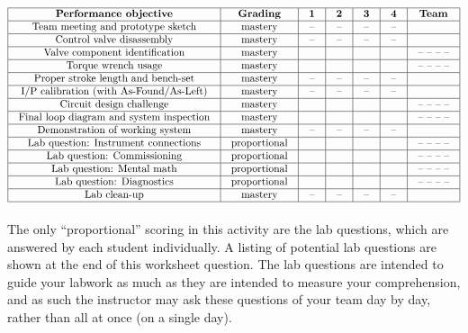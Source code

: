 \documentclass[12pt,a4paper]{article}
\begin{document}
\begin{itemize}


$$\vbox{\offinterlineskip
\halign{\strut
\vrule \quad\hfil # \ \hfil & 
\vrule \quad\hfil # \ \hfil & 
\vrule \quad\hfil # \ \hfil & 
\vrule \quad\hfil # \ \hfil & 
\vrule \quad\hfil # \ \hfil & 
\vrule \quad\hfil # \ \hfil & 
\vrule \quad\hfil # \ \hfil \vrule \cr
\noalign{\hrule}
%
{\bf Performance objective} & {\bf Grading} & {\bf 1} & {\bf 2} & {\bf 3} & {\bf 4} & {\bf Team} \cr
%
\noalign{\hrule}
%
Team meeting and prototype sketch & mastery & -- & -- & -- & -- & \cr
%
\noalign{\hrule}
%
Control valve disassembly & mastery & -- & -- & -- & -- & \cr
%
\noalign{\hrule}
%
Valve component identification & mastery & & & & & -- -- -- -- \cr
%
\noalign{\hrule}
%
Torque wrench usage & mastery & & & & & -- -- -- -- \cr
%
\noalign{\hrule}
%
Proper stroke length and bench-set & mastery & -- & -- & -- & -- & \cr
%
\noalign{\hrule}
%
I/P calibration (with As-Found/As-Left) & mastery & -- & -- & -- & -- &  \cr
%
\noalign{\hrule}
%
Circuit design challenge & mastery & & & & & -- -- -- -- \cr
%
\noalign{\hrule}
%
Final loop diagram and system inspection & mastery & & & & & -- -- -- -- \cr
%
\noalign{\hrule}
%
Demonstration of working system & mastery & -- & -- & -- & -- & \cr
%
\noalign{\hrule}
%
Lab question: Instrument connections & proportional &  &  &  &  & -- -- -- -- \cr
%
\noalign{\hrule}
%
Lab question: Commissioning & proportional &  &  &  &  & -- -- -- -- \cr
%
\noalign{\hrule}
%
Lab question: Mental math & proportional &  &  &  &  & -- -- -- -- \cr
%
\noalign{\hrule}
%
Lab question: Diagnostics & proportional &  &  &  &  & -- -- -- -- \cr
%
\noalign{\hrule}
%
Lab clean-up & mastery & -- & -- & -- & -- &  \cr
%
\noalign{\hrule}
} %
}$$ %

The only ``proportional'' scoring in this activity are the lab questions, which are answered by each student individually.  A listing of potential lab questions are shown at the end of this worksheet question.  The lab questions are intended to guide your labwork as much as they are intended to measure your comprehension, and as such the instructor may ask these questions of your team day by day, rather than all at once (on a single day).


\end{itemize}
\end{document}
